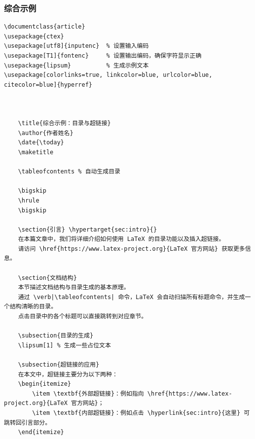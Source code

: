 \subsubsection{综合示例}
\begin{lstlisting}
\documentclass{article}
\usepackage{ctex}
\usepackage[utf8]{inputenc}  % 设置输入编码
\usepackage[T1]{fontenc}     % 设置输出编码，确保字符显示正确
\usepackage{lipsum}          % 生成示例文本
\usepackage[colorlinks=true, linkcolor=blue, urlcolor=blue, citecolor=blue]{hyperref}


	
	\title{综合示例：目录与超链接}
	\author{作者姓名}
	\date{\today}
	\maketitle
	
	\tableofcontents % 自动生成目录
	
	\bigskip
	\hrule
	\bigskip
	
	\section{引言} \hypertarget{sec:intro}{}
	在本篇文章中，我们将详细介绍如何使用 LaTeX 的目录功能以及插入超链接。  
	请访问 \href{https://www.latex-project.org}{LaTeX 官方网站} 获取更多信息。
	
	\section{文档结构}
	本节描述文档结构与目录生成的基本原理。  
	通过 \verb|\tableofcontents| 命令，LaTeX 会自动扫描所有标题命令，并生成一个结构清晰的目录。  
	点击目录中的各个标题可以直接跳转到对应章节。
	
	\subsection{目录的生成}
	\lipsum[1] % 生成一些占位文本
	
	\subsection{超链接的应用}
	在本文中，超链接主要分为以下两种：
	\begin{itemize}
		\item \textbf{外部超链接}：例如指向 \href{https://www.latex-project.org}{LaTeX 官方网站}；
		\item \textbf{内部超链接}：例如点击 \hyperlink{sec:intro}{这里} 可跳转回引言部分。
	\end{itemize}
	

\end{lstlisting}
